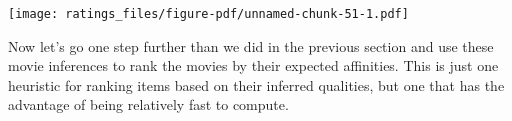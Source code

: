 \documentclass[
  letterpaper,
  DIV=11,
  numbers=noendperiod]{scrartcl}
\newenvironment{Shaded}{\begin{snugshade}}{\end{snugshade}}
\newcommand{\AttributeTok}[1]{\textcolor[rgb]{0.40,0.45,0.13}{#1}}
\newcommand{\ControlFlowTok}[1]{\textcolor[rgb]{0.00,0.23,0.31}{#1}}
\newcommand{\DecValTok}[1]{\textcolor[rgb]{0.68,0.00,0.00}{#1}}
\newcommand{\FunctionTok}[1]{\textcolor[rgb]{0.28,0.35,0.67}{#1}}
\newcommand{\NormalTok}[1]{\textcolor[rgb]{0.00,0.23,0.31}{#1}}
\newcommand{\OtherTok}[1]{\textcolor[rgb]{0.00,0.23,0.31}{#1}}
\newcommand{\SpecialCharTok}[1]{\textcolor[rgb]{0.37,0.37,0.37}{#1}}
\newcommand{\StringTok}[1]{\textcolor[rgb]{0.13,0.47,0.30}{#1}}
\begin{document}
\begin{Shaded}
\end{Shaded}

\texttt{[image: ratings\_files/figure-pdf/unnamed-chunk-51-1.pdf]}

Now let's go one step further than we did in the previous section and
use these movie inferences to rank the movies by their expected
affinities. This is just one heuristic for ranking items based on their
inferred qualities, but one that has the advantage of being relatively
fast to compute.
\end{document}
